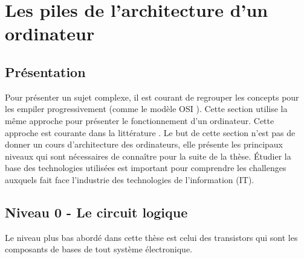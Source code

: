 \section{Les piles de l'architecture d'un ordinateur}




\subsection{Présentation}

Pour présenter un sujet complexe, il est courant de regrouper les concepts pour les empiler progressivement (comme le modèle OSI \cite{day1983osi}). Cette section utilise la même approche pour présenter le fonctionnement d'un ordinateur. Cette approche est courante dans la littérature \cite{tanenbaum2016structured}. Le but de cette section n'est pas de donner un cours d'architecture des ordinateurs, elle présente les principaux niveaux qui sont nécessaires de connaître pour la suite de la thèse. Étudier la base des technologies utilisées est important pour comprendre les challenges auxquels fait face l'industrie des technologies de l'information (IT).



\subsection{Niveau 0 - Le circuit logique}
Le niveau plus bas abordé dans cette thèse est celui des transistors qui sont les composants de bases de tout système électronique. 

